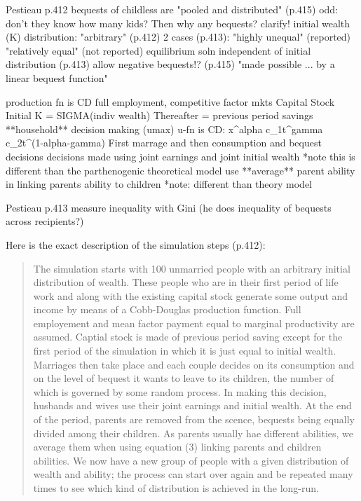 \documentclass{article}
\begin{document}
\begin{verbatimtab}[4]
Pestieau p.412
        bequests of childless are "pooled and distributed" (p.415)
		odd: don't they know how many kids? Then why any bequests? clarify!
	initial wealth (K) distribution:
		"arbitrary" (p.412)
		2 cases (p.413):
			"highly unequal" (reported)
			"relatively equal" (not reported)
			equilibrium soln independent of initial distribution (p.413)
	allow negative bequests!? (p.415)
		"made possible ... by a linear bequest function"
			
	production fn is CD
	full employment, competitive factor mkts
	Capital Stock
		Initial K = SIGMA(indiv wealth)
		Thereafter = previous period savings
	**household** decision making (umax)
		u-fn is CD: x^alpha c_{1}t^gamma c_{2}t^(1-alpha-gamma)
	First marrage and then consumption and bequest decisions
		decisions made using joint earnings and joint initial wealth
			*note this is different than the parthenogenic theoretical model
	use **average** parent ability in linking parents ability to children
		*note: different than theory model
	
Pestieau p.413
	measure inequality with Gini (he does inequality of bequests across recipients?)

\end{verbatimtab}

Here is the exact description of the simulation steps (p.412):
\begin{quote}
The simulation starts with 100 unmarried people with an arbitrary initial distribution of wealth.
These people who are in their first period of life work and along with the existing capital stock
generate some output and income by means of a Cobb-Douglas production function.
Full employement and mean factor payment equal to marginal productivity are assumed.
Captial stock is made of previous period saving except for the first period of the simulation in
which it is just equal to initial wealth.
Marriages then take place and each couple decides on its consumption and on the level of bequest
it wants to leave to its children,
the number of which is governed by some random process.
In making this decision, husbands and wives use their joint earnings and initial wealth.
At the end of the period, parents are removed from the scence,
bequests being equally divided among their children.
As parents usually hae different abilities, we average them when using equation (3)
linking parents and children abilities.
We now have a new group of people with a given distribution of wealth and ability;
the process can start over again and be repeated many times to see which kind of
distribution is achieved in the long-run.
\end{quote}
\end{document}
